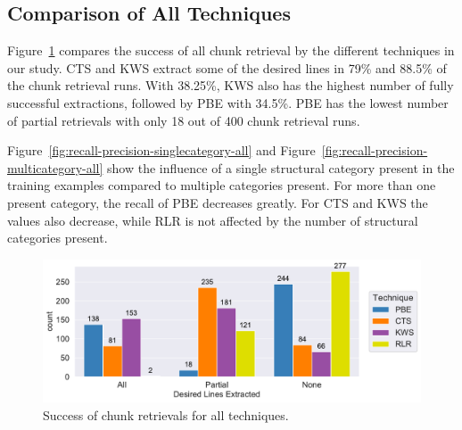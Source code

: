 
\subsection{Comparison of All Techniques}
Figure~\ref{fig:success-partial-all} compares the success of all chunk retrieval by the different techniques in our study.
CTS and KWS extract some of the desired lines in 79\% and 88.5\% of the chunk retrieval runs.
With 38.25\%, KWS also has the highest number of fully successful extractions, followed by PBE with 34.5\%.
PBE has the lowest number of partial retrievals with only 18 out of 400 chunk retrieval runs.


Figure~\ref{fig:recall-precision-singlecategory-all} and Figure~\ref{fig:recall-precision-multicategory-all} show the influence of a single structural category present in the training examples compared to multiple categories present.
For more than one present category, the recall of PBE decreases greatly.
For CTS and KWS the values also decrease, while RLR is not affected by the number of structural categories present.

\begin{figure}[!t]
		\centering
		\includegraphics[width=\columnwidth, clip]{img/big-study/success-partial-all.pdf}
		\caption{Success of chunk retrievals for all techniques.}
		\label{fig:success-partial-all}
\end{figure}


